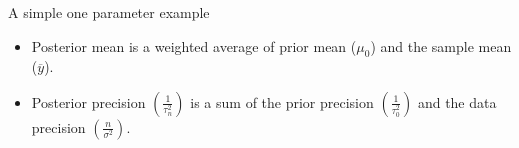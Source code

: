 \documentclass{beamer}
\begin{document}
\begin{frame}{A simple one parameter example}

\vspace{-0.1in}
\begin{footnotesize}
\begin{itemize}
\item Posterior mean is a weighted average of prior mean ($\mu_0$) and the sample mean ($\overline{y}$).
\item Posterior precision $\left(\frac{1}{\tau_n^2}\right)$ is a sum of the prior precision $\left(\frac{1}{\tau_0^2}\right)$ and the data precision $\left(\frac{n}{\sigma^2}\right)$.
\end{itemize}
\end{footnotesize}
\vspace{-0.5in}

\end{frame}
\end{document}
